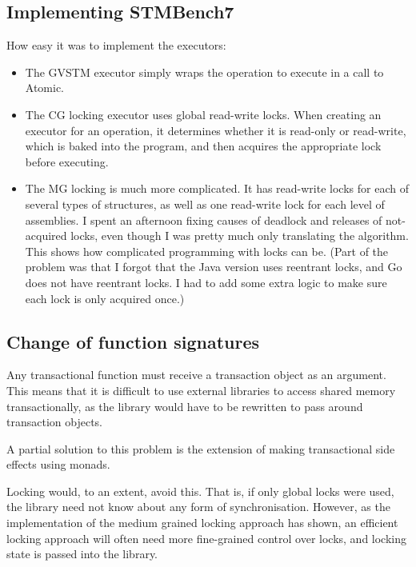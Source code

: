 \documentclass[12pt,a4paper,oneside,openright]{report}
\begin{document}
\subsection{Implementing STMBench7}
\label{sec:eval:impl-stmb}

How easy it was to implement the executors:

\begin{itemize}
\item The GVSTM executor simply wraps the operation to execute in a
  call to Atomic.
\item The CG locking executor uses global read-write locks. When
  creating an executor for an operation, it determines whether it is
  read-only or read-write, which is baked into the program, and then
  acquires the appropriate lock before executing.
\item The MG locking is much more complicated. It has read-write locks
  for each of several types of structures, as well as one read-write
  lock for each level of assemblies. I spent an afternoon fixing
  causes of deadlock and releases of not-acquired locks, even though I
  was pretty much only translating the algorithm. This shows how
  complicated programming with locks can be. (Part of the problem was
  that I forgot that the Java version uses reentrant locks, and Go
  does not have reentrant locks. I had to add some extra logic to make
  sure each lock is only acquired once.)
\end{itemize}

\subsection{Change of function signatures}
\label{sec:eval:change-funct-sign}

Any transactional function must receive a transaction object as an
argument. This means that it is difficult to use external libraries to
access shared memory transactionally, as the library would have to be
rewritten to pass around transaction objects.

A partial solution to this problem is the extension of making
transactional side effects using monads.

Locking would, to an extent, avoid this. That is, if only global locks
were used, the library need not know about any form of
synchronisation. However, as the implementation of the medium grained
locking approach has shown, an efficient locking approach will often
need more fine-grained control over locks, and locking state is passed
into the library.
\end{document}
